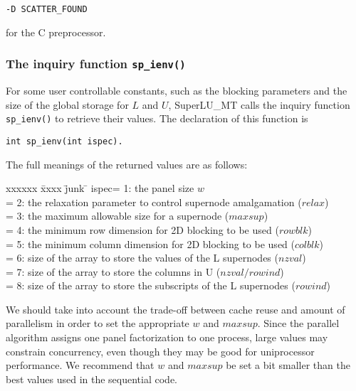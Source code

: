 \vspace{.1in}
{\tt -D SCATTER\_FOUND}
\vspace{.1in}

\noindent for the C preprocessor.

\subsubsection{The inquiry function {\tt sp\_ienv()}}
\label{sec:SuperLU_MT_sp_ienv}

For some user controllable constants, such as the blocking parameters
and the size of the global storage for $L$ and $U$, SuperLU\_MT
calls the inquiry function {\tt sp\_ienv()} to retrieve their values.
The declaration of this function is

\vspace{.1in}
{\tt int sp\_ienv(int ispec).}
\vspace{.1in}

The full meanings of the returned values are as follows:
\begin{tabbing}
xxxxxx \= xxxx \= junk \= \kill
\>ispec\>= 1: the panel size $w$ \\
\>     \>= 2: the relaxation parameter to control supernode amalgamation
		($relax$) \\
\>     \>= 3: the maximum allowable size for a supernode ($maxsup$)\\
\>     \>= 4: the minimum row dimension for 2D blocking to be used ($rowblk$)\\
\>     \>= 5: the minimum column dimension for 2D blocking to be used ($colblk$)\\

\>     \>= 6: size of the array to store the values of the L supernodes ($nzval$)\\
\>     \>= 7: size of the array to store the columns in U ($nzval/rowind$) \\
\>     \>= 8: size of the array to store the subscripts of the L supernodes ($rowind$)
\end{tabbing}

We should take into account the trade-off between cache reuse and amount 
of parallelism in order to set the appropriate $w$ and $maxsup$. 
Since the parallel algorithm
assigns one panel factorization to one process, large values may
constrain concurrency, even though they may be good for uniprocessor
performance. We recommend that $w$ and $maxsup$ be set a bit smaller
than the best values used in the sequential code.

